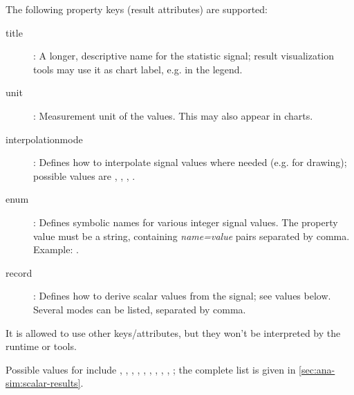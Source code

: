 The following property keys (result attributes) are supported:

\begin{description}
  \item[title]: A longer, descriptive name for the statistic signal; result
      visualization tools may use it as chart label, e.g. in the legend.
  \item[unit]: Measurement unit of the values. This may also appear in charts.
  \item[interpolationmode]: Defines how to interpolate signal values where
      needed (e.g. for drawing); possible values are ,
      , , .
  \item[enum]: Defines symbolic names for various integer signal values.
      The property value must be a string, containing \textit{name=value} pairs
      separated by comma. Example: .
  \item[record]: Defines how to derive scalar values from the signal;
     see values below. Several modes can be listed, separated by comma.
\end{description}

It is allowed to use other keys/attributes, but they won't be interpreted
by the {\opp} runtime or tools.

Possible values for  include , , ,
, , , , , ,
; the complete list is given in \ref{sec:ana-sim:scalar-results}.


%
%
%
%
%


